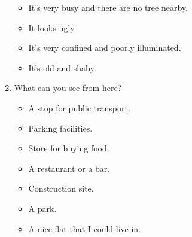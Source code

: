 \documentclass[letterpaper]{article}
\begin{document}
\begin{enumerate}
\begin{itemize}
		\item It's very busy and there are no tree nearby.
		\item It looks ugly.
		\item It's very confined and poorly illuminated.
		\item It's old and shaby.
	\end{itemize}
	\item What can you see from here?
	\begin{itemize}
		\item A stop for public transport.
		\item Parking facilities.
		\item Store for buying food.
		\item A restaurant or a bar.
		\item Construction site.
		\item A park.
		\item A nice flat that I could live in.
	\end{itemize}
\end{enumerate}
\end{document}

